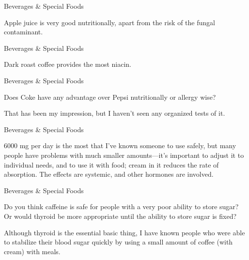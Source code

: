 \documentclass[11pt,oneside,openany,extrafontsizes]{memoir}
\begin{document}
\begin{standalonequote}{Beverages \& Special Foods}

    \begin{answer}
      Apple juice is very good nutritionally, apart from the risk of the fungal contaminant.
    \end{answer}
\end{standalonequote}

\begin{standalonequote}{Beverages \& Special Foods}

    \begin{answer}
      Dark roast coffee provides the most niacin.
    \end{answer}
\end{standalonequote}

\begin{qaexchange}{Beverages \& Special Foods}

    \begin{question}
        Does Coke have any advantage over Pepsi nutritionally or allergy wise?
    \end{question}

    \begin{answer}
       That has been my impression, but I haven't seen any organized tests of it. 
    \end{answer}
\end{qaexchange}

\begin{standalonequote}{Beverages \& Special Foods}

    \begin{answer}
      6000 mg per day is the most that I've known someone to use safely, but many people have problems with much smaller amounts—it's important to adjust it to individual needs, and to use it with food; cream in it reduces the rate of absorption. The effects are systemic, and other hormones are involved.
    \end{answer}
\end{standalonequote}

\begin{qaexchange}{Beverages \& Special Foods}

    \begin{question}
        Do you think caffeine is safe for people with a very poor ability to store sugar? Or would thyroid be more appropriate until the ability to store sugar is fixed?
    \end{question}

    \begin{answer}
      Although thyroid is the essential basic thing, I have known people who were able to stabilize their blood sugar quickly by using a small amount of coffee (with cream) with meals.
    \end{answer}
\end{qaexchange}
\end{document}
